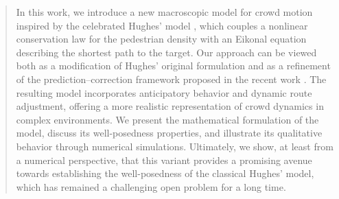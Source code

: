 \documentclass[final,reqno]{amsart}
\theoremstyle{plain}
\theoremstyle{definition}
\theoremstyle{remark}
\numberwithin{remark}{section}	%
\numberwithin{example}{section}	%
\begin{document}




  

\makeatletter	%
\newcommand{\thmtag}[1]{	%
  \let\oldthetheorem\thetheorem	%
  \renewcommand{\thetheorem}{#1}	%
  \g@addto@macro\endtheorem{	%
    \addtocounter{theorem}{0}	%
    \global\let\thetheorem\oldthetheorem}	%
  }
\makeatother

\makeatletter	%
\newcommand{\asmtag}[1]{	%
  \let\oldtheassumption\theassumption	%
  \renewcommand{\theassumption}{#1}	%
  \g@addto@macro\endassumption{	%
    \addtocounter{assumption}{0}	%
    \global\let\theassumption\oldtheassumption}	%
  }
\makeatother

\begin{abstract}
In this work, we introduce a new macroscopic model for crowd motion inspired by the celebrated Hughes' model \cite{Hughes2002, Hughes2003}, which couples a nonlinear conservation law for the pedestrian density with an Eikonal equation describing the shortest path to the target. Our approach can be viewed both as a modification of Hughes' original formulation and as a refinement of the prediction–correction framework proposed in the recent work \cite{ennaji2023prediction}. The resulting model incorporates anticipatory behavior and dynamic route adjustment, offering a more realistic representation of crowd dynamics in complex environments. We present the mathematical formulation of the model, discuss its well-posedness properties, and illustrate its qualitative behavior through numerical simulations. Ultimately, we show, at least from a numerical perspective, that this variant provides a promising avenue towards establishing the well-posedness of the classical Hughes' model, which has remained a challenging open problem for a long time.


\end{abstract}
\end{document}
